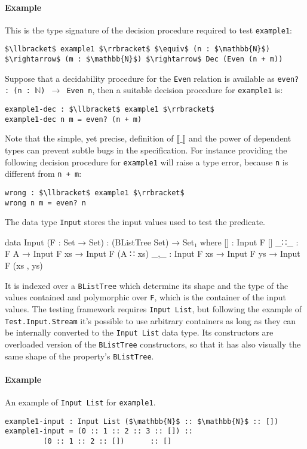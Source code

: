 \documentclass[10pt,a4paper]{article}
\begin{document}
\paragraph{Example}
This is the type signature of the decision procedure required to test \texttt{example1}:
\begin{lstlisting}
$\llbracket$ example1 $\rrbracket$ $\equiv$ (n : $\mathbb{N}$) $\rightarrow$ (m : $\mathbb{N}$) $\rightarrow$ Dec (Even (n + m))
\end{lstlisting}
Suppose that a decidability procedure for the \texttt{Even} relation is available as \texttt{even? : (n : $\mathbb{N}$) $\rightarrow$ Even n}, then a suitable decision procedure for \texttt{example1} is:
\begin{lstlisting}
example1-dec : $\llbracket$ example1 $\rrbracket$
example1-dec n m = even? (n + m)
\end{lstlisting}
Note that the simple, yet precise, definition of $\llbracket\_\rrbracket$ 
and the power of dependent types can prevent subtle bugs in the specification.
For instance providing the following decision procedure for \texttt{example1} will raise a type error, because \texttt{n} is different from \texttt{n + m}:
\begin{lstlisting}
wrong : $\llbracket$ example1 $\rrbracket$ 
wrong n m = even? n
\end{lstlisting}


The data type \texttt{Input} stores the input values used to test the predicate.
\begin{code}
data Input (F : Set → Set) : (BListTree Set) → Set₁ where
  [] : Input F []
  _∷_ : F A → Input F xs → Input F (A ∷ xs)
  _,_ : Input F xs → Input F ys → Input F (xs , ys)
\end{code}
It is indexed over a \texttt{BListTree} which determine its shape and the type of the values contained and polymorphic over \texttt{F}, which is the container of the input values.
The testing framework requires \texttt{Input List}, but following the example of \texttt{Test.Input.Stream} it's possible to use arbitrary containers as long as they can be internally converted to the \texttt{Input List} data type.
Its constructors are overloaded version of the \texttt{BListTree} constructors, so that it has also visually the same shape of the property's \texttt{BListTree}.
\paragraph{Example} An example of \texttt{Input List} for \texttt{example1}.
\begin{lstlisting}
example1-input : Input List ($\mathbb{N}$ :: $\mathbb{N}$ :: [])
example1-input = (0 :: 1 :: 2 :: 3 :: []) :: 
		 (0 :: 1 :: 2 :: [])      :: []
\end{lstlisting}
\end{document}
